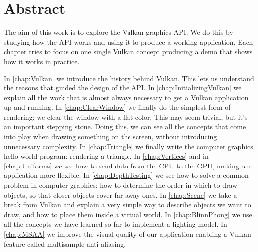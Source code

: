\chapter*{Abstract}

The aim of this work is to explore the Vulkan graphics API.
We do this by studying how the API works and using it to produce a working
application.
Each chapter tries to focus on one single Vulkan concept producing a demo
that shows how it works in practice.

In \autoref{chap:Vulkan} we introduce the history behind Vulkan.
This lets us understand the reasons that guided the design of the API.
In \autoref{chap:InitializingVulkan} we explain all the work that is almost
always necessary to get a Vulkan application up and running.
In \autoref{chap:ClearWindow} we finally do the simplest form of rendering:
we clear the window with a flat color.
This may seem trivial, but it's an important stepping stone.
Doing this, we can see all the concepts that come into play when drawing something
on the screen, without introducing unnecessary complexity.
In \autoref{chap:Triangle} we finally write the computer graphics hello world
program: rendering a triangle.
In \autoref{chap:Vertices} and in \autoref{chap:Uniforms} we see how to send
data from the CPU to the GPU, making our application more flexible.
In \autoref{chap:DepthTesting} we see how to solve a common problem in computer
graphics: how to determine the order in which to draw objects, so that closer
objects cover far away ones.
In \autoref{chap:Scene} we take a break from Vulkan and
explain a very simple way to describe objects we want to draw, and how
to place them inside a virtual world.
In \autoref{chap:BlinnPhong} we use all the concepts we have learned so far
to implement a lighting model.
In \autoref{chap:MSAA} we improve the visual quality of our application
enabling a Vulkan feature called multisample anti aliasing.
